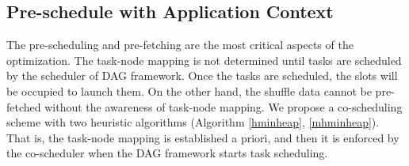 \subsection{Pre-schedule with Application Context}
The pre-scheduling and pre-fetching are the most critical aspects of the optimization. 
The task-node mapping is not determined until tasks are scheduled by the scheduler of DAG framework. 
Once the tasks are scheduled, the slots will be occupied to launch them. 
On the other hand, the shuffle data cannot be pre-fetched without the awareness of task-node mapping.
We propose a co-scheduling scheme with two heuristic algorithms (Algorithm \ref{hminheap}, \ref{mhminheap}). 
That is, the task-node mapping is established a priori, and then it is enforced by the co-scheduler when the DAG framework starts task scheduling. 
